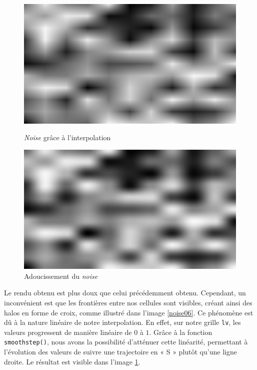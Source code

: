 \begin{figure}[h]
  \begin{minipage}[b]{0.45\linewidth}
    \centering
    \includegraphics[width=\linewidth]{images/noise/noise06.JPG}
    \caption{\textit{Noise} grâce à l'interpolation}
    \label{noise06}
  \end{minipage}
  \hspace{0.1\linewidth} %
  \begin{minipage}[b]{0.45\linewidth}
    \centering
    \includegraphics[width=\linewidth]{images/noise/noise07.JPG}
    \caption{Adoucissement du \textit{noise}}
    \label{noise07}
  \end{minipage}
\end{figure}

Le rendu obtenu est plus doux que celui précédemment obtenu. Cependant, un inconvénient est que les frontières entre nos cellules sont visibles, créant ainsi des halos en forme de croix, comme illustré dans l'image \ref{noise06}. Ce phénomène est dû à la nature linéaire de notre interpolation. En effet, sur notre grille \lstinline{lv}, les valeurs progressent de manière linéaire de $0$ à $1$. Grâce à la fonction \lstinline{smoothstep()}, nous avons la possibilité d'atténuer cette linéarité, permettant à l'évolution des valeurs de suivre une trajectoire en « S » plutôt qu'une ligne droite. Le résultat est visible dans l'image \ref{noise07}.

